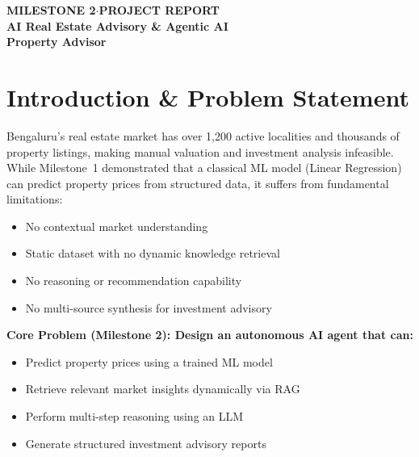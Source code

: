 \documentclass[11pt,a4paper]{article}
\begin{document}

\begin{flushleft}
{\small\color{accentblue}\textbf{MILESTONE 2\;\;$\cdot$\;\;PROJECT REPORT}}\\[0.5em]
{\fontsize{24}{29}\selectfont\bfseries AI Real Estate Advisory \& Agentic AI\\[0.15em] Property Advisor}
\end{flushleft}

\vspace{1.8em}


\section{Introduction \& Problem Statement}

Bengaluru's real estate market has over 1,200 active localities and thousands of property listings, making manual valuation and investment analysis infeasible. While Milestone~1 demonstrated that a classical ML model (Linear Regression) can predict property prices from structured data, it suffers from fundamental limitations:

\begin{itemize}
    \item No contextual market understanding
    \item Static dataset with no dynamic knowledge retrieval
    \item No reasoning or recommendation capability
    \item No multi-source synthesis for investment advisory
\end{itemize}

\vspace{0.2em}
\textbf{Core Problem (Milestone 2): Design an autonomous AI agent that can:}

\begin{itemize}
    \item Predict property prices using a trained ML model
    \item Retrieve relevant market insights dynamically via RAG
    \item Perform multi-step reasoning using an LLM
    \item Generate structured investment advisory reports
\end{itemize}
\end{document}
